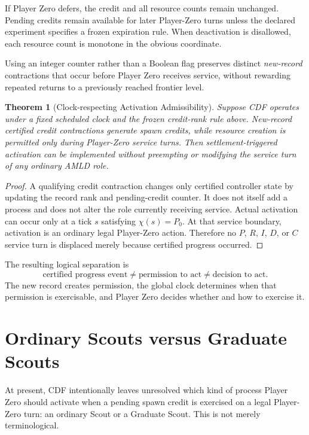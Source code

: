 \documentclass[11pt]{article}
\newtheorem{theorem}{Theorem}[section]
\theoremstyle{definition}
\begin{document}
If Player Zero defers, the credit and all resource counts remain unchanged. Pending credits remain available for later Player-Zero turns unless the declared experiment specifies a frozen expiration rule. When deactivation is disallowed, each resource count is monotone in the obvious coordinate.

Using an integer counter rather than a Boolean flag preserves distinct \emph{new-record} contractions that occur before Player Zero receives service, without rewarding repeated returns to a previously reached frontier level.

\begin{theorem}[Clock-respecting Activation Admissibility]
Suppose CDF operates under a fixed scheduled clock and the frozen credit-rank rule above. New-record certified credit contractions generate spawn credits, while resource creation is permitted only during Player-Zero service turns. Then settlement-triggered activation can be implemented without preempting or modifying the service turn of any ordinary AMLD role.
\end{theorem}

\begin{proof}
A qualifying credit contraction changes only certified controller state by updating the record rank and pending-credit counter. It does not itself add a process and does not alter the role currently receiving service. Actual activation can occur only at a tick $s$ satisfying $\chi(s)=P_0$. At that service boundary, activation is an ordinary legal Player-Zero action. Therefore no $P$, $R$, $I$, $D$, or $C$ service turn is displaced merely because certified progress occurred.
\end{proof}

The resulting logical separation is
\[
\boxed{
\text{certified progress event}
\neq
\text{permission to act}
\neq
\text{decision to act}.}
\]
The new record creates permission, the global clock determines when that permission is exercisable, and Player Zero decides whether and how to exercise it.


\section{Ordinary Scouts versus Graduate Scouts}

At present, CDF intentionally leaves unresolved which kind of process Player Zero should activate when a pending spawn credit is exercised on a legal Player-Zero turn: an ordinary Scout or a Graduate Scout. This is not merely terminological.
\end{document}
